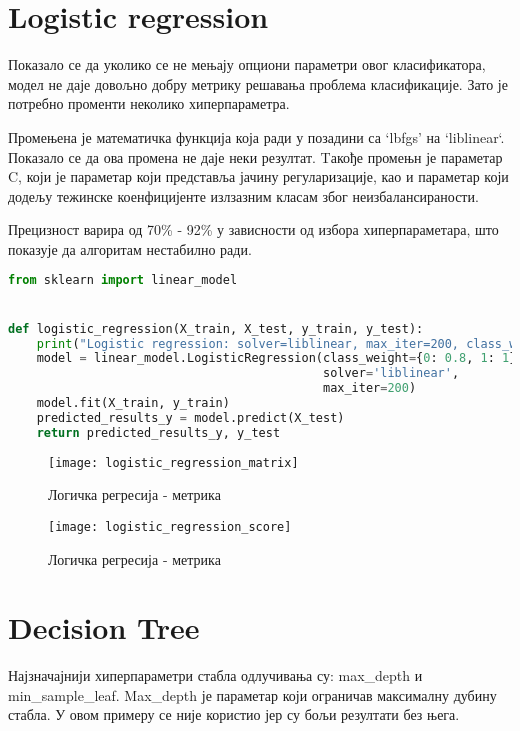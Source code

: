\documentclass[11pt]{article} %
\begin{document}
\section{Logistic regression}

Показало се да уколико се не мењају опциони параметри овог класификатора, модел не даје довољно добру метрику решавања проблема класификације. Зато је потребно променти неколико хиперпараметра. 

Промењена је математичка функција која ради у позадини са ‘lbfgs’ на `liblinear`. Показало се да ова промена не даје неки резултат. Tакође промењн је параметар C, који је параметар који представља јачину регуларизације, као и параметар који додељу тежинске коенфицијенте излзазним класам због неизбалансираности.

Прецизност варира од 70\% - 92\% у зависности од избора хиперпараметара, што показује да алгоритам нестабилно ради. 

\begin{lstlisting}[language=Python,title=Пример 4. Логичка регресија - фајл /classificators/logistic\_regression.py]
from sklearn import linear_model


def logistic_regression(X_train, X_test, y_train, y_test):
    print("Logistic regression: solver=liblinear, max_iter=200, class_weight={0:0.8, 1:1}, C=0.7")
    model = linear_model.LogisticRegression(class_weight={0: 0.8, 1: 1}, C=0.7,
                                            solver='liblinear',
                                            max_iter=200)
    model.fit(X_train, y_train)
    predicted_results_y = model.predict(X_test)
    return predicted_results_y, y_test
\end{lstlisting}

\begin{figure}[h]
\centering
	\texttt{[image: logistic\_regression\_matrix]} 
	\caption{Логичка регресија - метрика} 
\end{figure}

\begin{figure}[h]
\centering
	\texttt{[image: logistic\_regression\_score]} 
	\caption{Логичка регресија - метрика} 
\end{figure}


\section{Decision Tree}
Најзначајнији хиперпараметри стабла одлучивања су: max\_depth и min\_sample\_leaf.
Max\_depth је параметар који ограничав максималну дубину стабла. У овом примеру се није користио јер су бољи резултати без њега.
\end{document}
